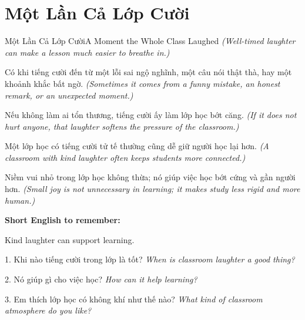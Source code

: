\section{Một Lần Cả Lớp Cười}
\begin{truyen}{Một Lần Cả Lớp Cười}{A Moment the Whole Class Laughed}
\textit{(Well-timed laughter can make a lesson much easier to breathe in.)}

Có khi tiếng cười đến từ một lỗi sai ngộ nghĩnh, một câu nói thật thà, hay một khoảnh khắc bất ngờ.
\textit{(Sometimes it comes from a funny mistake, an honest remark, or an unexpected moment.)}

Nếu không làm ai tổn thương, tiếng cười ấy làm lớp học bớt căng.
\textit{(If it does not hurt anyone, that laughter softens the pressure of the classroom.)}

Một lớp học có tiếng cười tử tế thường cũng dễ giữ người học lại hơn.
\textit{(A classroom with kind laughter often keeps students more connected.)}
\end{truyen}

\begin{baihoc}
Niềm vui nhỏ trong lớp học không thừa; nó giúp việc học bớt cứng và gần người hơn.
\textit{(Small joy is not unnecessary in learning; it makes study less rigid and more human.)}
\end{baihoc}

\begin{ghinhoanh}
\textbf{Short English to remember:}

Kind laughter can support learning.

\end{ghinhoanh}

\begin{tuhocnhanh}
1. Khi nào tiếng cười trong lớp là tốt? \textit{When is classroom laughter a good thing?}

2. Nó giúp gì cho việc học? \textit{How can it help learning?}

3. Em thích lớp học có không khí như thế nào? \textit{What kind of classroom atmosphere do you like?}
\end{tuhocnhanh}
\ngancach

